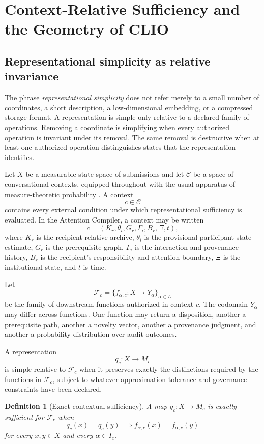 \documentclass[11pt]{article}
\newtheorem{definition}{Definition}[section]
\theoremstyle{definition}
\newcommand{\F}{\mathcal{F}}
\begin{document}
\section{Context-Relative Sufficiency and the Geometry of CLIO}

\subsection{Representational simplicity as relative invariance}

The phrase \emph{representational simplicity} does not refer merely to a small number of coordinates, a short description, a low-dimensional embedding, or a compressed storage format. A representation is simple only relative to a declared family of operations. Removing a coordinate is simplifying when every authorized operation is invariant under its removal. The same removal is destructive when at least one authorized operation distinguishes states that the representation identifies.

Let \(X\) be a measurable state space of submissions and let \(\mathcal C\) be a space of conversational contexts, equipped throughout with the usual apparatus of measure-theoretic probability \cite{billingsley1995,durrett2019}. A context
\[
c\in\mathcal C
\]
contains every external condition under which representational sufficiency is evaluated. In the Attention Compiler, a context may be written
\[
c
=
(K_r,\theta_i,G_r,\Gamma_i,B_r,\Xi,t),
\]
where \(K_r\) is the recipient-relative archive, \(\theta_i\) is the provisional participant-state estimate, \(G_r\) is the prerequisite graph, \(\Gamma_i\) is the interaction and provenance history, \(B_r\) is the recipient's responsibility and attention boundary, \(\Xi\) is the institutional state, and \(t\) is time.

Let
\[
\F_c
=
\{f_{\alpha,c}:X\to Y_\alpha\}_{\alpha\in I_c}
\]
be the family of downstream functions authorized in context \(c\). The codomain \(Y_\alpha\) may differ across functions. One function may return a disposition, another a prerequisite path, another a novelty vector, another a provenance judgment, and another a probability distribution over audit outcomes.

A representation
\[
q_c:X\to M_c
\]
is simple relative to \(\F_c\) when it preserves exactly the distinctions required by the functions in \(\F_c\), subject to whatever approximation tolerance and governance constraints have been declared.

\begin{definition}[Exact contextual sufficiency]
A map \(q_c:X\to M_c\) is exactly sufficient for \(\F_c\) when
\[
q_c(x)=q_c(y)
\implies
f_{\alpha,c}(x)=f_{\alpha,c}(y)
\]
for every \(x,y\in X\) and every \(\alpha\in I_c\).
\end{definition}
\end{document}
